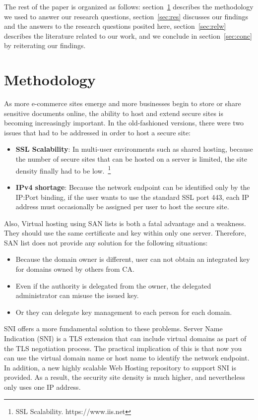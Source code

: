 \documentclass{acm_proc_article-sp}
\begin{document}
The rest of the paper is organized as follows: section~\ref{sec:method} describes the methodology we used to answer our research questions, section~\ref{sec:res} discusses our findings and the answers to the research questions posited here, section~\ref{sec:relw} describes the literature related to our work, and we conclude in section~\ref{sec:conc} by reiterating our findings.

\section{Methodology} \label{sec:method}

As more e-commerce sites emerge and more businesses begin to store or share sensitive documents online, the ability to host and extend secure sites is becoming increasingly important. In the old-fashioned versions, there were two issues that had to be addressed in order to host a secure site:
\begin{itemize}
\item \textbf{SSL Scalability}: In multi-user environments such as shared hosting, because the number of secure sites that can be hosted on a server is limited, the site density finally had to be low.~\footnote{SSL Scalability. https://www.iis.net}
\item \textbf{IPv4 shortage}: Because the network endpoint can be identified only by the IP:Port binding, if the user wants to use the standard SSL port 443, each IP address must occasionally be assigned per user to host the secure site.
\end{itemize}

Also, Virtual hosting using SAN lists is both a fatal advantage and a weakness. They should  use the same certificate and key within only one server. Therefore, SAN list does not provide any solution for the following situations:
\begin{itemize}
\item Because the domain owner is different, user can not obtain an integrated key for domains owned by others from CA.
\item Even if the authority is delegated from the owner, the delegated administrator can misuse the issued key.
\item Or they can delegate key management to each person for each domain.
\end{itemize}

SNI offers a more fundamental solution to these problems. Server Name Indication (SNI) is a TLS extension that can include virtual domains as part of the TLS negotiation process. The practical implication of this is that now you can use the virtual domain name or host name to identify the network endpoint. In addition, a new highly scalable Web Hosting repository to support SNI is provided. As a result, the security site density is much higher, and nevertheless only uses one IP address.
\end{document}
